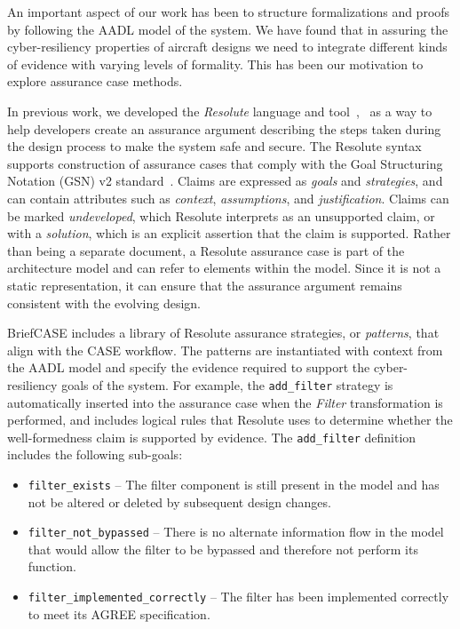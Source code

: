 An important aspect of our work has been to structure formalizations and proofs by following
the AADL model of the system. 
We have found that in assuring the cyber-resiliency properties of aircraft designs we need to integrate
different kinds of evidence with varying levels of formality. This has been our motivation to
explore assurance case methods.

In previous work, we developed the {\em Resolute} language and
tool~\cite{resolute2014},~\cite{resolute-destion} as a way to help developers create an assurance
argument describing the steps taken during the design process to make the system safe and secure.
The Resolute syntax supports construction of assurance cases that comply with the Goal Structuring
Notation (GSN) v2 standard~\cite{GSNv2}. Claims are expressed as \textit{goals} and
\textit{strategies}, and can contain attributes such as \textit{context}, \textit{assumptions}, and
\textit{justification}. Claims can be marked \textit{undeveloped}, which Resolute interprets as an
unsupported claim, or with a \textit{solution}, which is an explicit assertion that the claim is
supported. Rather than being a separate document, a Resolute assurance case is part of the
architecture model and can refer to elements within the model. Since it is not a static
representation, it can ensure that the assurance argument remains consistent with the evolving
design.

BriefCASE includes a library of Resolute assurance strategies, or \emph{patterns}, that align with
the CASE workflow. The patterns are instantiated with context from the AADL model and specify the
evidence required to support the cyber-resiliency goals of the system. For example, the
\texttt{add\_filter} strategy is automatically inserted into the assurance case when the
\textit{Filter} transformation is performed, and includes logical rules that Resolute uses to
determine whether the well-formedness claim is supported by evidence. The \texttt{add\_filter}
definition 
includes the following sub-goals:
\begin{itemize} 
\item \texttt{filter\_exists} -- The filter component is still present in the model and has not be 
altered or deleted by subsequent design changes. 
\item \texttt{filter\_not\_bypassed} -- There is no alternate information flow in the model that 
would allow the filter to be bypassed and therefore not perform its function.   
\item \texttt{filter\_implemented\_correctly} -- The filter has been implemented correctly 
to meet its AGREE specification.  
\end{itemize}

